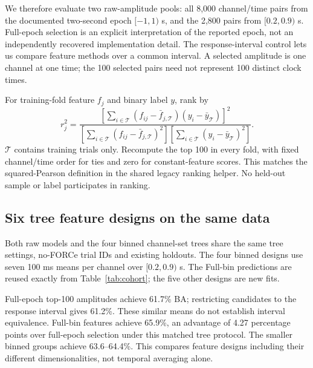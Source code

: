 \documentclass[11pt,a4paper]{article}
\begin{document}
We therefore evaluate two raw-amplitude pools: all 8,000 channel/time pairs from the documented two-second epoch $[-1,1)$ s, and the 2,800 pairs from $[0.2,0.9)$ s. Full-epoch selection is an explicit interpretation of the reported epoch, not an independently recovered implementation detail. The response-interval control lets us compare feature methods over a common interval. A selected amplitude is one channel at one time; the 100 selected pairs need not represent 100 distinct clock times.

For training-fold feature $f_j$ and binary label $y$, rank by
\[
r_j^2=\frac{\left[\sum_{i\in\mathcal T}(f_{ij}-\bar f_{j,\mathcal T})(y_i-\bar y_{\mathcal T})\right]^2}
{\left[\sum_{i\in\mathcal T}(f_{ij}-\bar f_{j,\mathcal T})^2\right]
 \left[\sum_{i\in\mathcal T}(y_i-\bar y_{\mathcal T})^2\right]}.
\]
$\mathcal T$ contains training trials only. Recompute the top 100 in every fold, with fixed channel/time order for ties and zero for constant-feature scores. This matches the squared-Pearson definition in the shared legacy ranking helper. No held-out sample or label participates in ranking.

\subsection{Six tree feature designs on the same data}
Both raw models and the four binned channel-set trees share the same tree settings, no-FORCe trial IDs and existing holdouts. The four binned designs use seven 100 ms means per channel over $[0.2,0.9)$ s. The Full-bin predictions are reused exactly from Table~\ref{tab:cohort}; the five other designs are new fits.
\begin{table}[H]\centering\small\setlength{\tabcolsep}{3.5pt}

\caption{Participant-weighted validation results for the six matched trees ($N=23$, 67 sessions). $p$ is inputs to the tree; percentage columns are Acc., BA, D recall and ND recall. AUC is unscaled. Raw selection has 8,000 or 2,800 candidate amplitudes before retaining 100.}\label{tab:graz}
\end{table}
Full-epoch top-100 amplitudes achieve 61.7\% BA; restricting candidates to the response interval gives 61.2\%. These similar means do not establish interval equivalence. Full-bin features achieve 65.9\%, an advantage of 4.27 percentage points over full-epoch selection under this matched tree protocol. The smaller binned groups achieve 63.6--64.4\%. This compares feature designs including their different dimensionalities, not temporal averaging alone.
\end{document}
